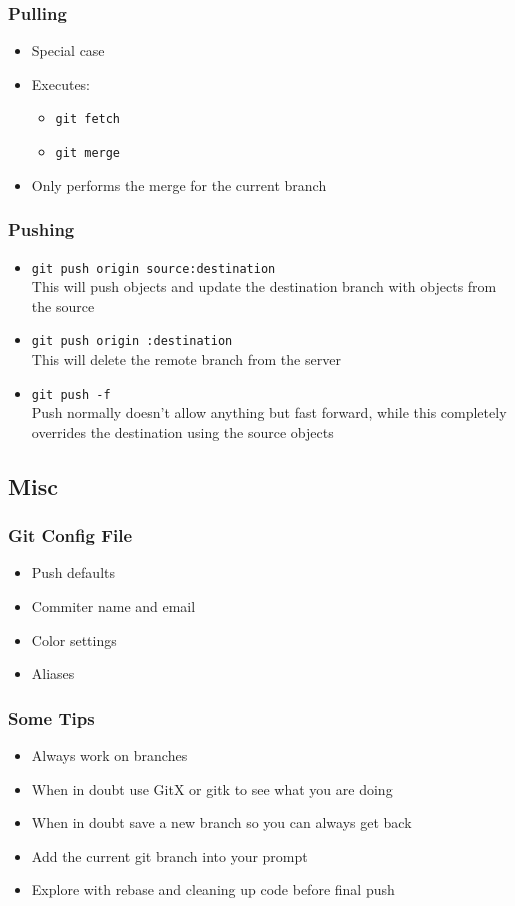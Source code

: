 \begin{frame}
  \frametitle{Pulling}
  \begin{itemize}
  \item Special case
  \item Executes:
    \begin{itemize}
    \item \texttt{git fetch}
    \item \texttt{git merge}
    \end{itemize}
  \item Only performs the merge for the current branch
  \end{itemize}
\end{frame}

\begin{frame}
  \frametitle{Pushing}
  \begin{itemize}
    \item \texttt{git push origin source:destination} \\ This will push objects
      and update the destination branch with objects from the source
      \pause
    \item \texttt{git push origin :destination} \\ This will delete the remote
      branch from the server
      \pause
    \item \texttt{git push -f} \\ Push normally doesn't allow anything but fast
      forward, while this completely overrides the destination using the source
      objects
  \end{itemize}
\end{frame}

\subsection{Misc}

\begin{frame}
  \frametitle{Git Config File}
  \begin{itemize}
    \item Push defaults
    \item Commiter name and email
    \item Color settings
    \item Aliases
  \end{itemize}
\end{frame}

\begin{frame}
  \frametitle{Some Tips}
  \begin{itemize}
    \item Always work on branches
      \pause
    \item When in doubt use GitX or gitk to see what you are doing
      \pause
    \item When in doubt save a new branch so you can always get back
      \pause
    \item Add the current git branch into your prompt
      \pause
    \item Explore with rebase and cleaning up code before final push
  \end{itemize}
\end{frame}


